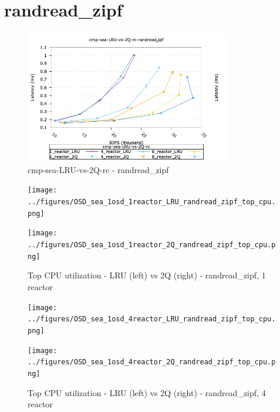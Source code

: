 \pagebreak
\section{randread\_zipf}

\begin{figure}[!ht]
\centering
\includegraphics[width=0.8\textwidth]{../figures/cmp_sea_LRU_vs_2Q_rc_randread_zipf_iops_vs_lat.png}
\caption{cmp-sea-LRU-vs-2Q-rc - randread\_zipf}
\label{fig:cmp_sea_LRU_vs_2Q_rc_randread_zipf}
\end{figure}


\begin{figure}[!ht]
  \centering
  \begin{minipage}{.5\textwidth}
  \centering
    \texttt{[image: ../figures/OSD\_sea\_1osd\_1reactor\_LRU\_randread\_zipf\_top\_cpu.png]}
  \end{minipage}%
  \begin{minipage}{.5\textwidth}
  \centering
    \texttt{[image: ../figures/OSD\_sea\_1osd\_1reactor\_2Q\_randread\_zipf\_top\_cpu.png]}
  \end{minipage}%
  \caption{Top CPU utilization - LRU (left) vs 2Q (right) - randread\_zipf, 1 reactor}
  \label{figure:1-reactor-cpu-randread_zipf}
\end{figure}


\begin{figure}[!ht]
  \centering
  \begin{minipage}{.5\textwidth}
  \centering
    \texttt{[image: ../figures/OSD\_sea\_1osd\_4reactor\_LRU\_randread\_zipf\_top\_cpu.png]}
  \end{minipage}%
  \begin{minipage}{.5\textwidth}
  \centering
    \texttt{[image: ../figures/OSD\_sea\_1osd\_4reactor\_2Q\_randread\_zipf\_top\_cpu.png]}
  \end{minipage}%
  \caption{Top CPU utilization - LRU (left) vs 2Q (right) - randread\_zipf, 4 reactor}
  \label{figure:4-reactor-cpu-randread_zipf}
\end{figure}


